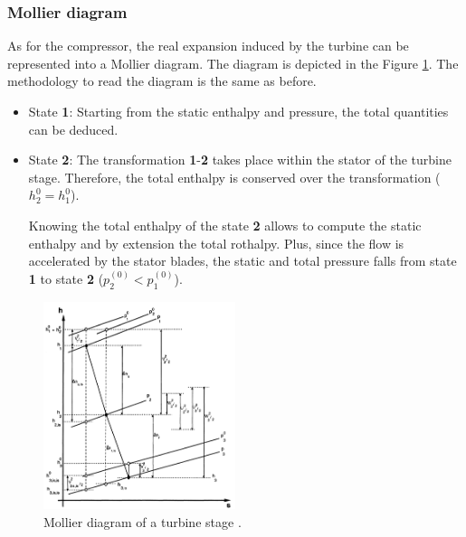 \subsubsection{Mollier diagram}
As for the compressor, the real expansion induced by the turbine can be represented into a Mollier diagram. The diagram is depicted in the Figure \ref{fig:C4_Mollierturb}. The methodology to read the diagram is the same as before.


\begin{itemize}
    \item State \textbf{1}: Starting from the static enthalpy and pressure, the total quantities can be deduced.
    \item State \textbf{2}: The transformation \textbf{1}-\textbf{2} takes place within the stator of the turbine stage. Therefore, the total enthalpy is conserved over the transformation ($h_2^0=h_1^0$).

    Knowing the total enthalpy of the state \textbf{2} allows to compute the static enthalpy and by extension the total rothalpy. Plus, since the flow is accelerated by the stator blades, the static and total pressure falls from state \textbf{1} to state \textbf{2} (\(p_2^{(0)}<p_1^{(0)}\)).
\end{itemize}

\begin{figure}[h]
    \centering
    \includegraphics[width=0.5\textwidth]{Turb_mollier.png}
    \caption{Mollier diagram of a turbine stage \cite{Hillewaert2019}.}
    \label{fig:C4_Mollierturb}
\end{figure}

